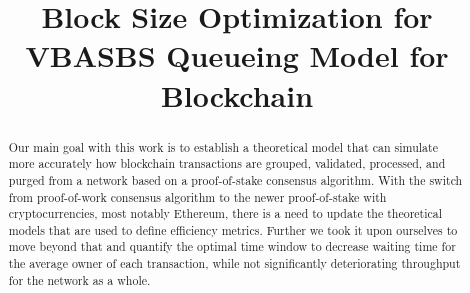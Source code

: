 \documentclass[conference]{IEEEtran}
\begin{document}
\title{Block Size Optimization for VBASBS Queueing Model for Blockchain}

\author{
}

\maketitle

\begin{abstract}

Our main goal with this work is to establish a theoretical model that can simulate
more accurately how blockchain transactions are grouped, validated, processed,
and purged from a network based on a proof-of-stake consensus algorithm. With 
the switch from proof-of-work consensus algorithm to the newer proof-of-stake with 
cryptocurrencies, most notably Ethereum, there is a need to update the theoretical 
models that are used to define efficiency metrics. Further we took it upon ourselves 
to move beyond that and quantify the optimal time window to decrease waiting time
for the average owner of each transaction, while not significantly deteriorating throughput
for the network as a whole.

\end{abstract}
\end{document}
